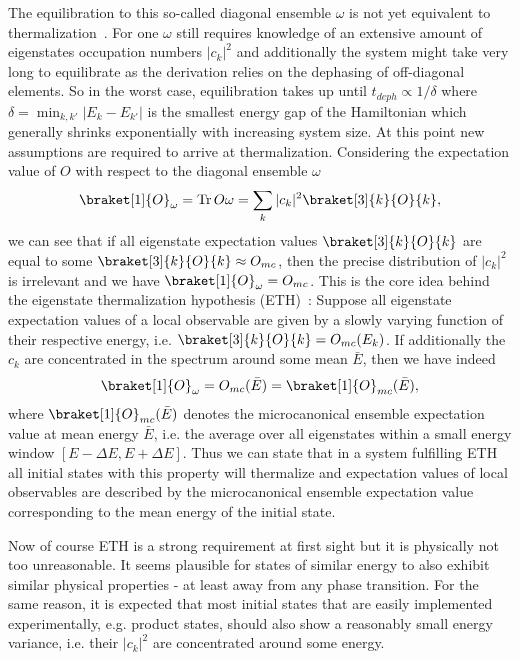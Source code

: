 The equilibration to this so-called diagonal ensemble $\omega$ is not yet equivalent to thermalization~\cite{dziarmagaDynamicsQuantumPhase2010,polkovnikovColloquiumNonequilibriumDynamics2011}. For one $\omega$ still requires knowledge of an extensive amount of eigenstates occupation numbers  $|c_k|^2$ and additionally the system might take very long to equilibrate as the derivation relies on the dephasing of off-diagonal elements. So in the worst case, equilibration takes up until $t_{deph} \propto 1/\delta$ where $\delta=\min_{k,k'}|E_k-E_{k'}|$ is the smallest energy gap of the Hamiltonian which generally shrinks exponentially with increasing system size. At this point new assumptions are required to arrive at thermalization. Considering the expectation value of $O$ with respect to the diagonal ensemble $\omega$
\begin{equation}
	\braket[1]{O}_{\omega} = \Tr O \omega = \sum_k |c_k|^2 \braket[3]{k}{O}{k},
\end{equation}
we can see that if all eigenstate expectation values $\braket[3]{k}{O}{k}$ are equal to some $\braket[3]{k}{O}{k}\approx O_{mc}$, then the precise distribution of $|c_k|^2$ is irrelevant and we have $\braket[1]{O}_{\omega} = O_{mc}$. 
This is the core idea behind the eigenstate thermalization hypothesis (ETH)~\cite{deutschQuantumStatisticalMechanics1991,srednickiChaosQuantumThermalization1994,rigolThermalizationItsMechanism2008}: Suppose all eigenstate expectation values of a local observable are given by a slowly varying function of their respective energy, i.e. $\braket[3]{k}{O}{k}=O_{mc}(E_k)$. 
If additionally the $c_k$ are concentrated in the spectrum around some mean $\bar{E}$, then we have indeed
\begin{align}
	\braket[1]{O}_{\omega} = O_{mc}(\bar{E}) = \braket[1]{O}_{mc}(\bar{E}),
\end{align}
where $\braket[1]{O}_{mc}(\bar{E})$ denotes the microcanonical ensemble expectation value at mean energy $\bar{E}$, i.e. the average over all eigenstates within a small energy window $[E-\Delta E, E+\Delta E]$. Thus we can state that in a system fulfilling ETH all initial states with this property will thermalize and expectation values of local observables are described by the microcanonical ensemble expectation value corresponding to the mean energy of the initial state.

Now of course ETH is a strong requirement at first sight but it is physically not too unreasonable. It seems plausible for states of similar energy to also exhibit similar physical properties - at least away from any phase transition. For the same reason, it is expected that most initial states that are easily implemented experimentally, e.g. product states, should also show a reasonably small energy variance, i.e. their $|c_k|^2$ are concentrated around some energy.

